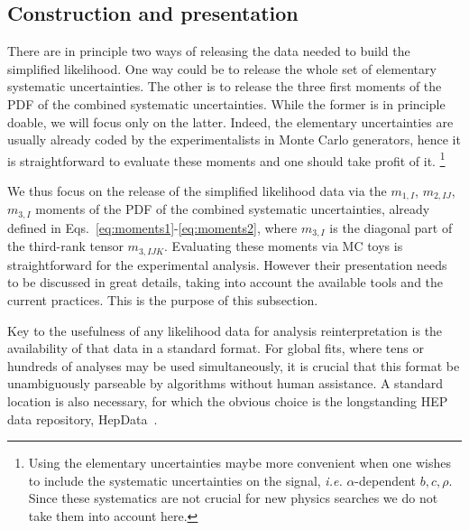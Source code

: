 \documentclass[11pt]{article}
\begin{document}



\subsection{Construction and  presentation}




There are in principle two ways of releasing the data needed to build the simplified likelihood. One way could be to release the whole set of elementary systematic uncertainties. The other is to release the three first moments of the PDF of the combined systematic uncertainties. While the former is in principle doable, we will focus only on the latter. Indeed, the elementary uncertainties are usually already  coded by the experimentalists in Monte Carlo generators, hence it is straightforward to evaluate these moments and one should take profit of it.  \footnote{
Using the elementary uncertainties maybe more convenient when one wishes to include the systematic uncertainties on the signal, \textit{i.e.}  $\alpha$-dependent $b,c,\rho$. Since these systematics are not crucial for new physics searches we do not take them into account here.
}




We thus focus on the release of the  simplified likelihood data via the  $m_{1,I}$, $m_{2,IJ}$, $m_{3,I}$
moments   of the PDF of the combined systematic uncertainties,  already defined in Eqs.~\eqref{eq:moments1}-\eqref{eq:moments2}, where $m_{3,I}$ is the diagonal part of the third-rank tensor $m_{3,IJK}$.  Evaluating these moments via MC toys is straightforward for the experimental analysis. However their presentation needs to be discussed in great details, taking into account  the available tools and the current practices. This is the purpose of this subsection.



 Key to the usefulness of any likelihood data for analysis reinterpretation is
the availability of that data in a standard format. For global fits, where tens
or hundreds of analyses may be used simultaneously, it is crucial that this
format be unambiguously parseable by algorithms without human assistance. A
standard location is also necessary, for which the obvious choice is the longstanding
HEP data repository, HepData~\cite{hepdata}.
\end{document}
